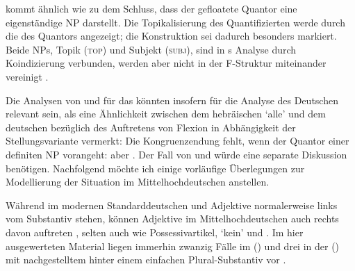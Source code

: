 \citet[533--534]{spector2009} kommt ähnlich wie \citet[29]{pittner1995} zu dem
Schluss, dass der gefloatete Quantor eine eigenständige NP darstellt. Die
Topikalisierung des Quantifizierten werde durch die  des
Quantors angezeigt; die Konstruktion sei dadurch besonders markiert. Beide NPs,
Topik (\textsc{top}) und Subjekt (\textsc{subj}), sind in
\citeauthor{spector2009}s Analyse durch Koindizierung verbunden, werden aber
nicht in der F-Struktur miteinander vereinigt
\autocite[vgl.][99]{bresnanetal2016}.

Die Analysen von \citet{shlonsky1991} und \citet{spector2009} für das
 könnten insofern für die Analyse des Deutschen
relevant sein, als \citet[179]{merchant1996} eine Ähnlichkeit zwischen dem
hebräischen  `alle' und dem deutschen
 bezüglich des Auftretens von Flexion in Abhängigkeit der
Stellungsvariante vermerkt: Die Kongruenzendung
fehlt, wenn der Quantor einer definiten NP vorangeht:  aber . Der Fall von  und  würde
eine separate Diskussion benötigen. Nachfolgend möchte ich einige vorläufige
Überlegungen zur Modellierung der Situation im
Mittelhochdeutschen anstellen.

Während im modernen Standarddeutschen  und
Adjektive normalerweise links vom Substantiv stehen,
können Adjektive im Mittelhochdeutschen auch rechts davon
auftreten \autocite[185--186, 237--243]{ksw2}, selten auch 
wie Possessivartikel,  `kein' und 
\autocite[515--517, 551--552, 623--624]{ksw2}. Im hier ausgewerteten Material
liegen immerhin zwanzig Fälle im 
(\CAO) und drei in der  (\KC) mit nachgestelltem
 hinter einem einfachen Plural-Substantiv vor
.



